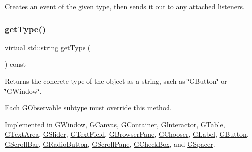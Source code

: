 Creates an event of the given type, then sends it out to any attached listeners. 

\mbox{\label{classsgl_1_1GObservable_a799e073a127b428cc841086d42ea4fed}} 
\subsubsection{\texorpdfstring{get\+Type()}{getType()}}
{\footnotesize\ttfamily virtual std\+::string get\+Type (\begin{DoxyParamCaption}{ }\end{DoxyParamCaption}) const\hspace{0.3cm}{\ttfamily [pure virtual]}}



Returns the concrete type of the object as a string, such as {\ttfamily \char`\"{}\+G\+Button\char`\"{}} or {\ttfamily \char`\"{}\+G\+Window\char`\"{}}. 

Each \mbox{\hyperlink{classsgl_1_1GObservable}{G\+Observable}} subtype must override this method. 

Implemented in \mbox{\hyperlink{classsgl_1_1GWindow_a9b72ede4ee8520f987a0c01e30654814}{G\+Window}}, \mbox{\hyperlink{classsgl_1_1GCanvas_a9b72ede4ee8520f987a0c01e30654814}{G\+Canvas}}, \mbox{\hyperlink{classsgl_1_1GContainer_a9b72ede4ee8520f987a0c01e30654814}{G\+Container}}, \mbox{\hyperlink{classsgl_1_1GInteractor_a44c407a54a20dd0f2fff30338289299d}{G\+Interactor}}, \mbox{\hyperlink{classsgl_1_1GTable_a9b72ede4ee8520f987a0c01e30654814}{G\+Table}}, \mbox{\hyperlink{classsgl_1_1GTextArea_a9b72ede4ee8520f987a0c01e30654814}{G\+Text\+Area}}, \mbox{\hyperlink{classsgl_1_1GSlider_a9b72ede4ee8520f987a0c01e30654814}{G\+Slider}}, \mbox{\hyperlink{classsgl_1_1GTextField_a9b72ede4ee8520f987a0c01e30654814}{G\+Text\+Field}}, \mbox{\hyperlink{classsgl_1_1GBrowserPane_a9b72ede4ee8520f987a0c01e30654814}{G\+Browser\+Pane}}, \mbox{\hyperlink{classsgl_1_1GChooser_a9b72ede4ee8520f987a0c01e30654814}{G\+Chooser}}, \mbox{\hyperlink{classsgl_1_1GLabel_a9b72ede4ee8520f987a0c01e30654814}{G\+Label}}, \mbox{\hyperlink{classsgl_1_1GButton_a9b72ede4ee8520f987a0c01e30654814}{G\+Button}}, \mbox{\hyperlink{classsgl_1_1GScrollBar_a9b72ede4ee8520f987a0c01e30654814}{G\+Scroll\+Bar}}, \mbox{\hyperlink{classsgl_1_1GRadioButton_a9b72ede4ee8520f987a0c01e30654814}{G\+Radio\+Button}}, \mbox{\hyperlink{classsgl_1_1GScrollPane_a9b72ede4ee8520f987a0c01e30654814}{G\+Scroll\+Pane}}, \mbox{\hyperlink{classsgl_1_1GCheckBox_a9b72ede4ee8520f987a0c01e30654814}{G\+Check\+Box}}, and \mbox{\hyperlink{classsgl_1_1GSpacer_a9b72ede4ee8520f987a0c01e30654814}{G\+Spacer}}.

